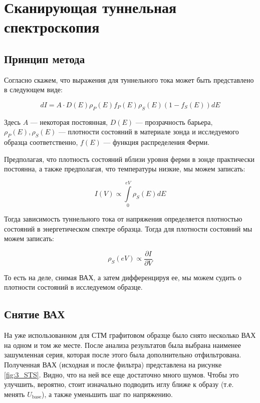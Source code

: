 \documentclass[a4paper, 12pt]{article}
\begin{document}
	\section{Сканирующая туннельная спектроскопия}
	
	\subsection{Принцип метода}
	
	Согласно \cite{Mironov} скажем, что выражения для туннельного тока может быть представлено в следующем виде:
	
	\begin{equation}
		dI = A \cdot D(E) \rho_P (E) f_P(E) \rho_S(E)(1 - f_S(E)) dE
	\end{equation}
	
	Здесь $A$ --- некоторая постоянная, $D(E)$ --- прозрачность барьера, $\rho_P(E), \rho_S(E)$ --- плотности состояний в материале зонда и исследуемого образца соответственно, $f(E)$ --- функция распределения Ферми.
	
	Предполагая, что плотность состояний вблизи уровня ферми в зонде практически постоянна, а также предполагая, что температуры низкие, мы можем записать:
	
	\begin{equation}
		I(V) \propto \int\limits_0^{eV} \rho_S(E)dE 
	\end{equation} 
	
	Тогда зависимость туннельного тока от напряжения определяется плотностью состояний в энергетическом спектре образца. Тогда для плотности состояний мы можем записать:
	
	\begin{equation}
		\rho_S(eV) \propto \frac{\partial I}{\partial V}
	\end{equation}
	
	То есть на деле, снимая ВАХ, а затем дифференцируя ее, мы можем судить о плотности состояний в исследуемом образце.
	
	\subsection{Снятие ВАХ}
	
	На уже использованном для СТМ графитовом образце было снято несколько ВАХ на одном и том же месте. После анализа результатов была выбрана наименее зашумленная серия, которая после этого была дополнительно отфильтрована. Полученная ВАХ (исходная и после фильтра) представлена на рисунке \ref{fig:3_STS}. Видно, что на ней все еще достаточно много шумов. Чтобы это улучшить, вероятно, стоит изначально подводить иглу ближе к образу (т.е. менять $U_{\text{base}}$), а также уменьшить шаг по напряжению.
	
\end{document}
